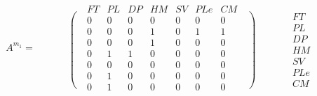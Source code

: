 \bigskip

\begin{equation*}
A^{m_1}=\begin{matrix}\text{ }\\\left.\phantom{\begin{matrix}\mathit{FT}\\\mathit{PL}\\\mathit{DP}\\\mathit{HM}\\\mathit{SV}\\\mathit{PLe}\\\mathit{CM}\end{matrix}}\right(\end{matrix}\begin{matrix}\mathit{FT}&\mathit{PL}&\mathit{DP}&\mathit{HM}&\mathit{SV}&\mathit{PLe}&\mathit{CM}\\0&0&0&0&0&0&0\\0&0&0&1&0&1&1\\0&0&0&1&0&0&0\\0&1&1&0&0&0&0\\0&0&0&0&0&0&0\\0&1&0&0&0&0&0\\0&1&0&0&0&0&0\end{matrix}\begin{matrix}\text{ }\\\left)\phantom{\begin{matrix}\mathit{FT}\\\mathit{PL}\\\mathit{DP}\\\mathit{HM}\\\mathit{SV}\\\mathit{PLe}\\\mathit{CM}\end{matrix}}\right.\end{matrix}\begin{matrix}\text{ }\\\mathit{FT}\\\mathit{PL}\\\mathit{DP}\\\mathit{HM}\\\mathit{SV}\\\mathit{PLe}\\\mathit{CM}\end{matrix}
\end{equation*}

\bigskip

